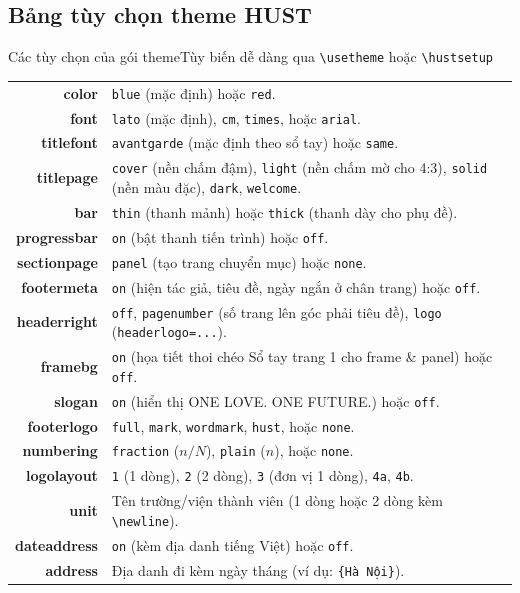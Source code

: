 \documentclass[aspectratio=169,10pt]{beamer}
\begin{document}
\subsection{Bảng tùy chọn theme HUST}
\begin{frame}{Các tùy chọn của gói theme}{Tùy biến dễ dàng qua \texttt{\textbackslash usetheme} hoặc \texttt{\textbackslash hustsetup}}
  \scriptsize
  \centering
  \begin{tabularx}{\textwidth}{>{\ttfamily\bfseries\color{hustmain}}r >{\small\raggedright\arraybackslash}X}
    color       & \texttt{blue} (mặc định) hoặc \texttt{red}. \\
    font        & \texttt{lato} (mặc định), \texttt{cm}, \texttt{times}, hoặc \texttt{arial}. \\
    titlefont   & \texttt{avantgarde} (mặc định theo sổ tay) hoặc \texttt{same}. \\
    titlepage   & \texttt{cover} (nền chấm đậm), \texttt{light} (nền chấm mờ cho 4:3), \texttt{solid} (nền màu đặc), \texttt{dark}, \texttt{welcome}. \\
    bar         & \texttt{thin} (thanh mảnh) hoặc \texttt{thick} (thanh dày cho phụ đề). \\
    progressbar & \texttt{on} (bật thanh tiến trình) hoặc \texttt{off}. \\
    sectionpage & \texttt{panel} (tạo trang chuyển mục) hoặc \texttt{none}. \\
    footermeta  & \texttt{on} (hiện tác giả, tiêu đề, ngày ngắn ở chân trang) hoặc \texttt{off}. \\
    headerright & \texttt{off}, \texttt{pagenumber} (số trang lên góc phải tiêu đề), \texttt{logo} (\texttt{headerlogo=...}). \\
    framebg     & \texttt{on} (họa tiết thoi chéo Sổ tay trang 1 cho frame \& panel) hoặc \texttt{off}. \\
    slogan      & \texttt{on} (hiển thị ONE LOVE. ONE FUTURE.) hoặc \texttt{off}. \\
    footerlogo  & \texttt{full}, \texttt{mark}, \texttt{wordmark}, \texttt{hust}, hoặc \texttt{none}. \\
    numbering   & \texttt{fraction} ($n/N$), \texttt{plain} ($n$), hoặc \texttt{none}. \\
    logolayout  & \texttt{1} (1 dòng), \texttt{2} (2 dòng), \texttt{3} (đơn vị 1 dòng), \texttt{4a}, \texttt{4b}. \\
    unit        & Tên trường/viện thành viên (1 dòng hoặc 2 dòng kèm \texttt{\textbackslash newline}). \\
    dateaddress & \texttt{on} (kèm địa danh tiếng Việt) hoặc \texttt{off}. \\
    address     & Địa danh đi kèm ngày tháng (ví dụ: \texttt{\{Hà Nội\}}). \\
  \end{tabularx}
\end{frame}
\end{document}

